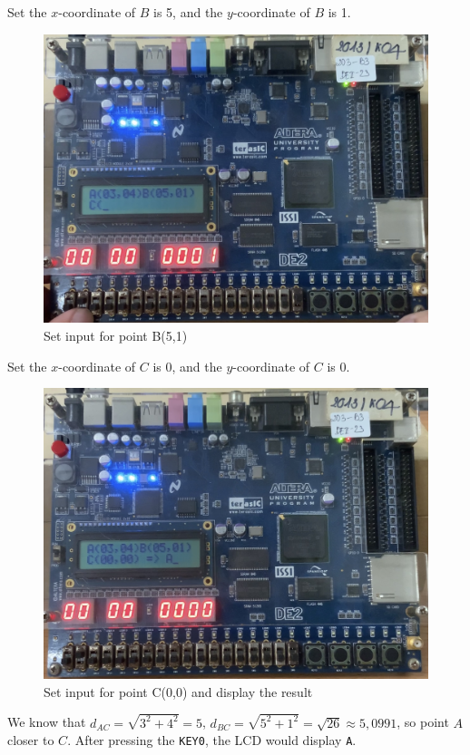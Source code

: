 \documentclass[12pt,a4paper,oneside]{book} %
\begin{document}
Set the $x$-coordinate of $B$ is 5, and the $y$-coordinate of $B$ is 1. 
 \begin{figure}[H]
    \begin{center}
    \includegraphics[width=.85\textwidth]{images/applicationB.jpg}
    \caption{Set input for point B(5,1)}
    \end{center}
\end{figure}

Set the $x$-coordinate of $C$ is 0, and the $y$-coordinate of $C$ is 0. 
 \begin{figure}[H]
    \begin{center}
    \includegraphics[width=.8\textwidth]{images/application.jpg}
    \caption{Set input for point C(0,0) and display the result}
    \end{center}
\end{figure}
We know that $d_{AC} = \sqrt{3^2 + 4^2} = 5$, $d_{BC} = \sqrt{5^2 + 1^2} = \sqrt{26} \approx 5,0991$, so point $A$ closer to $C$. After pressing the \texttt{KEY0}, the LCD would display \texttt{A}.
\end{document}
